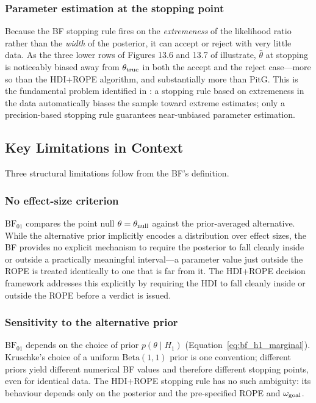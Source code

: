 \subsubsection*{Parameter estimation at the stopping point}

Because the BF stopping rule fires on the \emph{extremeness} of the likelihood ratio
rather than the \emph{width} of the posterior, it can accept or reject with very little
data.  As the three lower rows of Figures 13.6 and 13.7 of \citet{kruschke2015doing} illustrate, $\hat{\theta}$ at stopping is noticeably
biased away from $\theta_{\rm true}$ in both the accept and the reject case---more so
than the HDI+ROPE algorithm, and substantially more than PitG.  This is the fundamental problem
identified in \citet{kruschke2015doing}: a stopping rule based on extremeness in the data
automatically biases the sample toward extreme estimates; only a precision-based stopping
rule guarantees near-unbiased parameter estimation.

\subsection*{Key Limitations in Context}

Three structural limitations follow from the BF's definition.

\subsubsection*{No effect-size criterion}

$\mathrm{BF}_{01}$ compares the point null $\theta = \theta_{\rm null}$ against the
prior-averaged alternative.  While the alternative prior implicitly encodes a distribution
over effect sizes, the BF provides no explicit mechanism to require the posterior to fall
cleanly inside or outside a practically meaningful interval---a parameter value just
outside the ROPE is treated identically to one that is far from it.  The HDI+ROPE
decision framework addresses this explicitly by requiring the HDI to fall cleanly inside
or outside the ROPE before a verdict is issued.

\subsubsection*{Sensitivity to the alternative prior}

$\mathrm{BF}_{01}$ depends on the choice of prior $p(\theta \mid H_1)$
(Equation~\ref{eq:bf_h1_marginal}).  Kruschke's choice of a uniform
$\mathrm{Beta}(1,1)$ prior is one convention; different priors yield different
numerical BF values and therefore different stopping points, even for identical data.
The HDI+ROPE stopping rule has no such ambiguity: its behaviour depends only on the
posterior and the pre-specified ROPE and $\omega_{\rm goal}$.

